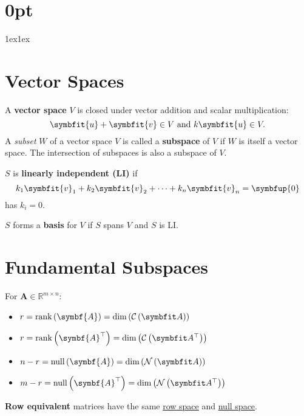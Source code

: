 \documentclass{article}
\begin{document}
\titlespacing*\section{0pt}{1ex}{1ex}
%
\setlength{\textfloatsep}{0pt}
%
\setlength{\abovedisplayskip}{1pt}
\setlength{\belowdisplayskip}{1pt}
%
\begin{minipage}[t]{62.39259259mm}
    \section*{Vector Spaces}
    A \textbf{vector space} \(V\) is closed under vector addition
    and scalar multiplication:
    \begin{equation*}
        \symbfit{u}+\symbfit{v} \in V \ \text{and} \ k\symbfit{u} \in V.
    \end{equation*}
    A \textit{subset} \(W\) of a vector space \(V\) is called a
    \textbf{subspace} of \(V\) if \(W\) is itself a vector space. The
    intersection of subspaces is also a subspace of \(V\).

    \(S\) is \textbf{linearly independent (LI)} if
    \begin{equation*}
        k_1 \symbfit{v}_1 + k_2 \symbfit{v}_2 + \cdots + k_n \symbfit{v}_n = \symbfup{0}
    \end{equation*}
    has \(k_i=0\).

    \(S\) forms a \textbf{basis} for \(V\) if \(S\) spans \(V\) and \(S\) is LI\@.
    \section*{Fundamental Subspaces}
    For \(\symbf{A}\in\mathbb{R}^{m \times n}\):
    \begin{itemize}
        \item \(r = \rank{\left( \symbf{A} \right)} = \dim{\left( \columnspace{A} \right)}\)
        \item \(r = \rank{\left( \symbf{A}^\top \right)} = \dim{\left( \rowspace{A} \right)}\)
        \item \(n - r = \vnull{\left( \symbf{A} \right)}      = \dim{\left( \nullspace{A} \right)}\)
        \item \(m - r = \vnull{\left( \symbf{A}^\top \right)} = \dim{\left( \leftnullspace{A} \right)}\)
    \end{itemize}
    \textbf{Row equivalent} matrices have the same
    \underline{row space} and \underline{null space}.

\end{minipage}
\end{document}
